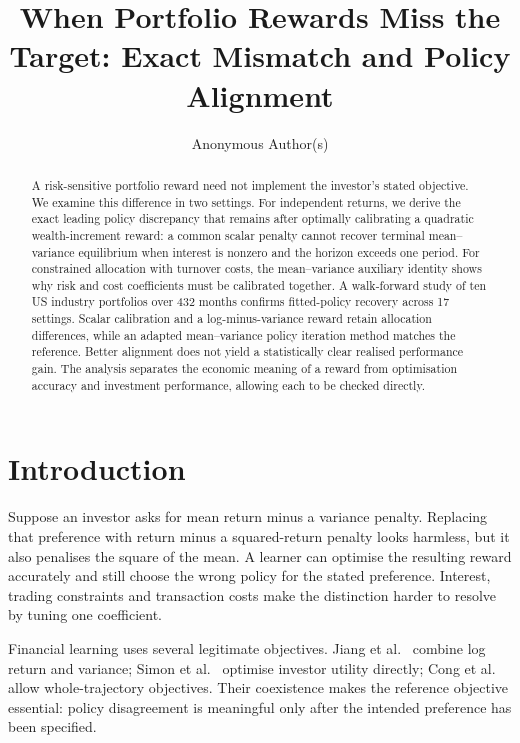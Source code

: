 \documentclass[sigconf,anonymous,review]{acmart}
\title{When Portfolio Rewards Miss the Target: Exact Mismatch and Policy Alignment}
\author{Anonymous Author(s)}
\begin{document}
\begin{abstract}
A risk-sensitive portfolio reward need not implement the investor's stated objective. We examine this difference in two settings. For independent returns, we derive the exact leading policy discrepancy that remains after optimally calibrating a quadratic wealth-increment reward: a common scalar penalty cannot recover terminal mean--variance equilibrium when interest is nonzero and the horizon exceeds one period. For constrained allocation with turnover costs, the mean--variance auxiliary identity shows why risk and cost coefficients must be calibrated together. A walk-forward study of ten US industry portfolios over 432 months confirms fitted-policy recovery across 17 settings. Scalar calibration and a log-minus-variance reward retain allocation differences, while an adapted mean--variance policy iteration method matches the reference. Better alignment does not yield a statistically clear realised performance gain. The analysis separates the economic meaning of a reward from optimisation accuracy and investment performance, allowing each to be checked directly.
\end{abstract}
\maketitle

\section{Introduction}
Suppose an investor asks for mean return minus a variance penalty. Replacing that preference with return minus a squared-return penalty looks harmless, but it also penalises the square of the mean. A learner can optimise the resulting reward accurately and still choose the wrong policy for the stated preference. Interest, trading constraints and transaction costs make the distinction harder to resolve by tuning one coefficient.

Financial learning uses several legitimate objectives. Jiang et al.\ \cite{jiang2025} combine log return and variance; Simon et al.\ \cite{simon2026} optimise investor utility directly; Cong et al.\ \cite{cong2026} allow whole-trajectory objectives. Their coexistence makes the reference objective essential: policy disagreement is meaningful only after the intended preference has been specified.
\end{document}
